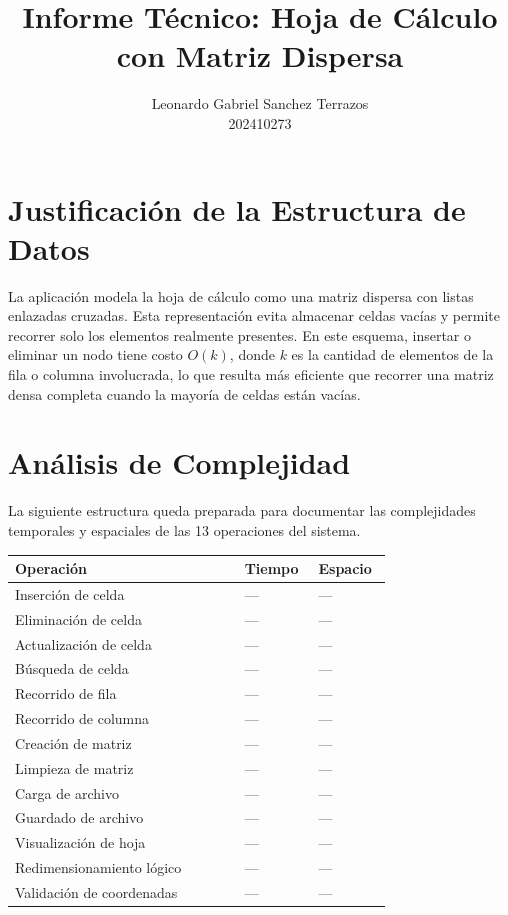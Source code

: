 \documentclass[10pt,a4paper]{article}
\title{Informe Técnico: Hoja de Cálculo con Matriz Dispersa}
\author{Leonardo Gabriel Sanchez Terrazos\\202410273}
\date{}
\begin{document}
\maketitle

\section*{Justificación de la Estructura de Datos}
La aplicación modela la hoja de cálculo como una matriz dispersa con listas enlazadas cruzadas. Esta representación evita almacenar celdas vacías y permite recorrer solo los elementos realmente presentes. En este esquema, insertar o eliminar un nodo tiene costo $O(k)$, donde $k$ es la cantidad de elementos de la fila o columna involucrada, lo que resulta más eficiente que recorrer una matriz densa completa cuando la mayoría de celdas están vacías.

\section*{Análisis de Complejidad}
La siguiente estructura queda preparada para documentar las complejidades temporales y espaciales de las 13 operaciones del sistema.

\vspace{0.5em}
\begin{tabular}{|>{\raggedright\arraybackslash}p{0.56\linewidth}|>{\centering\arraybackslash}p{0.18\linewidth}|>{\centering\arraybackslash}p{0.18\linewidth}|}
\hline
\textbf{Operación} & \textbf{Tiempo} & \textbf{Espacio} \\ \hline
Inserción de celda & --- & --- \\ \hline
Eliminación de celda & --- & --- \\ \hline
Actualización de celda & --- & --- \\ \hline
Búsqueda de celda & --- & --- \\ \hline
Recorrido de fila & --- & --- \\ \hline
Recorrido de columna & --- & --- \\ \hline
Creación de matriz & --- & --- \\ \hline
Limpieza de matriz & --- & --- \\ \hline
Carga de archivo & --- & --- \\ \hline
Guardado de archivo & --- & --- \\ \hline
Visualización de hoja & --- & --- \\ \hline
Redimensionamiento lógico & --- & --- \\ \hline
Validaci\'on de coordenadas & --- & --- \\ \hline
\end{tabular}
\end{document}

